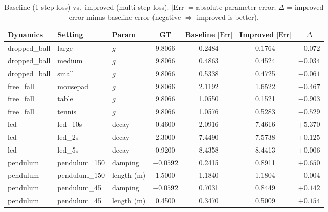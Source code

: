 %
% 

\begin{table}[t]
\centering
\caption{Baseline (1-step loss) vs.\ improved (multi-step loss). $|\mathrm{Err}|$ = absolute parameter error; $\Delta$ = improved error minus baseline error (negative $\Rightarrow$ improved is better).}
\label{tab:multistep}
\begin{tabular}{@{}lllS[table-format=2.4]S[table-format=2.4]S[table-format=2.4]S[table-format=-2.4]@{}}
\toprule
\textbf{Dynamics} & \textbf{Setting} & \textbf{Param} & {GT} & {Baseline $|\mathrm{Err}|$} & {Improved $|\mathrm{Err}|$} & {$\Delta$} \\
\midrule
dropped\_ball & large  & $g$ & 9.8066 & 0.2484 & 0.1764 & $-0.072$ \\
dropped\_ball & medium & $g$ & 9.8066 & 0.4863 & 0.4524 & $-0.034$ \\
dropped\_ball & small  & $g$ & 9.8066 & 0.5338 & 0.4725 & $-0.061$ \\
free\_fall    & mousepad & $g$ & 9.8066 & 2.1192 & 1.6522 & $-0.467$ \\
free\_fall    & table  & $g$ & 9.8066 & 1.0550 & 0.1521 & $-0.903$ \\
free\_fall    & tennis & $g$ & 9.8066 & 1.0576 & 0.5283 & $-0.529$ \\
led          & led\_10s & decay & 0.4600 & 2.0916 & 7.4616 & $+5.370$ \\
led          & led\_2s & decay & 2.3000 & 7.4490 & 7.5738 & $+0.125$ \\
led          & led\_5s & decay & 0.9200 & 8.4358 & 8.4413 & $+0.006$ \\
pendulum     & pendulum\_150 & damping & $-0.0592$ & 0.2415 & 0.8911 & $+0.650$ \\
pendulum     & pendulum\_150 & length (m) & 1.5000 & 1.1840 & 1.1804 & $-0.004$ \\
pendulum     & pendulum\_45 & damping & $-0.0592$ & 0.7031 & 0.8449 & $+0.142$ \\
pendulum     & pendulum\_45 & length (m) & 0.4500 & 0.3470 & 0.5009 & $+0.154$ \\

\end{tabular}
\end{table}
